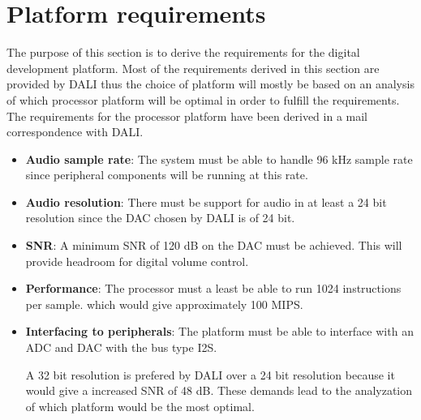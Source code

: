 \section{Platform requirements} \label{sec:platformReq}
The purpose of this section is to derive the requirements for the digital development platform. Most of the requirements derived in this section are provided by DALI thus the choice of platform will mostly be based on an analysis of which processor platform will be optimal in order to fulfill the requirements. The requirements for the processor platform have been derived in a mail correspondence with DALI.
\begin{itemize}
\item \textbf{Audio sample rate}: The system must be able to handle 96 kHz sample rate since peripheral components will be running at this rate.
\item \textbf{Audio resolution}: There must be support for audio in at least a 24 bit resolution since the \gls{DAC} chosen by DALI is of 24 bit.
\item \textbf{\gls{SNR}}: A minimum \gls{SNR} of 120 dB on the \gls{DAC} must be achieved. This will provide headroom for digital volume control.
\item \textbf{Performance}: The processor must a least be able to run 1024 instructions per sample. which would give approximately 100 \gls{MIPS}.
\item \textbf{Interfacing to peripherals}: The platform must be able to interface with an ADC and DAC with the bus type \gls{I2S}.


A 32 bit resolution is prefered by DALI over a 24 bit resolution because it would give a increased \gls{SNR} of 48 dB. These demands lead to the analyzation of which platform would be the most optimal.  
\end{itemize}



